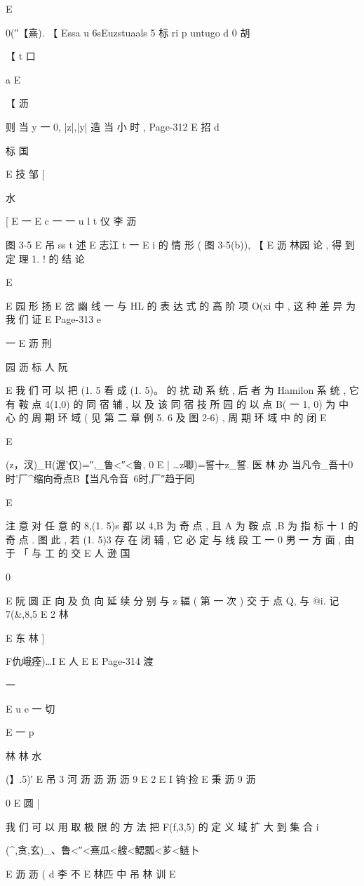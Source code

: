 {{{{{{{{{{{{{{{{E

0(″【熹). 【
Essa u
6sEuzstuaals 5 标 ri p
untugo d
0 胡

【 t 口

a
E

【
沥

则 当 y 一 0, |z|,|y| 造 当 小 时 ,
Page-312
E 招 d

标 国

E 技 邹
[

水

[
E 一
E
c
一 一
u l t 仪 李 沥

图 3-5
E 吊 ss t 述
E 志江 t 一
E i
的 情 形 ( 图 3-5(b)), 【
E 沥 林园
论 , 得 到 定 理 1. ! 的 结 论

E

E 园 形 扬
E
岔 幽 线 一 与 HL 的 表 达 式 的 高 阶 项 O(xi 中 , 这 种 差 异 为 我 们 证
E
Page-313
e

一
E 沥 刑

园 沥 标 人 阮

E
我 们 可 以 把 (1. 5 看 成 (1. 5)。 的 扰 动 系 统 , 后 者 为 Hamilon 系
统 , 它 有 鞍 点 4(1,0) 的 同 宿 辅 , 以 及 该 同 宿 技 所 园 的 以 点 B( 一 1,
0) 为 中 心 的 周 期 环 域 ( 见 第 二 章 例 5. 6 及 图 2-6) , 周 期 环 域 中 的 闭
E

E {(z，汊)_H(渥'仅)=″,_鲁<″<鲁, 0
E
| …z唧)=誓十z_誓. 医 林 办
当凡令_吾十0时'厂^缩向奇点B【当凡令音~6时,厂″趋于同

E

注 意 对 任 意 的 8,(1. 5)s 都 以 4,B 为 奇 点 , 且 A 为 鞍 点 ,B 为
指 标 十 1 的 奇 点 . 图 此 , 若 (1. 5)3 存 在 闭 辅 , 它 必 定 与 线 段 工 一
0 男 一 方 面 , 由 于 「 与 工 的 交
E 人 逊 国

0

E 阮 圆
正 向 及 负 向 延 续 分 别 与 z 辐 ( 第 一 次 ) 交 于 点 Q, 与 @i. 记 7(&,8,5
E 2 林

E 东 林
]

F仇峨痊)…I E 人
E
E
Page-314
渡

一

E
u e 一 切

E 一
p

林 林 水

(】.5)′
E 吊 3 河 沥 沥 沥 沥 9
E
2
E I 钨`捡 E 秉 沥 9
沥

0
E 圆 |

我 们 可 以 用 取 极 限 的 方 法 把 F(f,3,5) 的 定 义 域 扩 大 到 集 合
i {(^,贪,玄)_、鲁<″<熹瓜<艘<鳃瓢<芗<鲢卜

E 沥 沥 ( d 李 不
E 林匹 中 吊 林 训
E

}}}}}}}}}}}}}}}}}}

